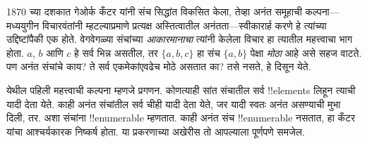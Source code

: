\documentclass[../../../include/open-logic-section]{subfiles}
\begin{document}


1870 च्या दशकात गेओर्क कँटर यांनी संच सिद्धांत
विकसित केला, तेव्हा अनंत समूहाची कल्पना---मध्ययुगीन विचारवंतांनी
म्हटल्याप्रमाणे प्रत्यक्ष अस्तित्वातील अनंतता---स्वीकारार्ह करणे हे
त्यांच्या उद्दिष्टांपैकी एक होते. वेगवेगळ्या संचांच्या \emph{आकारमानाचा}
त्यांनी केलेला विचार हा त्यातील महत्त्वाचा भाग होता. $a$, $b$ आणि $c$
हे सर्व भिन्न असतील, तर $\{a, b, c\}$ हा संच $\{a, b\}$ पेक्षा
\emph{मोठा} आहे असे सहज वाटते. पण अनंत संचांचे काय? ते सर्व
एकमेकांएवढेच मोठे असतात का? तसे नसते, हे दिसून येते.

येथील पहिली महत्त्वाची कल्पना म्हणजे प्रगणन. कोणत्याही सांत संचातील
सर्व !!{element}s लिहून त्याची यादी देता येते. काही अनंत संचांतील
सर्व चीही यादी देता येते, जर यादी स्वतः अनंत असण्याची
मुभा दिली, तर. अशा संचांना !!{enumerable} म्हणतात. काही अनंत संच
!!{enumerable} नसतात, हा कँटर यांचा आश्चर्यकारक निष्कर्ष होता.
या प्रकरणाच्या अखेरीस तो आपल्याला पूर्णपणे समजेल.
\end{document}
